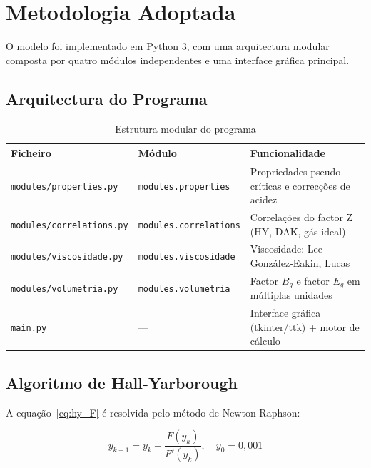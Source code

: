 \documentclass[12pt, a4paper]{article}
\begin{document}
\section{Metodologia Adoptada}

O modelo foi implementado em Python 3, com uma arquitectura modular composta por
quatro módulos independentes e uma interface gráfica principal.

\subsection{Arquitectura do Programa}

\begin{table}[H]
  \centering
  \caption{Estrutura modular do programa}
  \label{tab:modulos}
  \begin{tabular}{@{}lll@{}}
    \toprule
    \textbf{Ficheiro} & \textbf{Módulo} & \textbf{Funcionalidade} \\
    \midrule
    \texttt{modules/properties.py}   & \texttt{modules.properties}
      & Propriedades pseudo-críticas e correcções de acidez \\
    \texttt{modules/correlations.py} & \texttt{modules.correlations}
      & Correlações do factor Z (HY, DAK, gás ideal) \\
    \texttt{modules/viscosidade.py}  & \texttt{modules.viscosidade}
      & Viscosidade: Lee-González-Eakin, Lucas \\
    \texttt{modules/volumetria.py}   & \texttt{modules.volumetria}
      & Factor $B_g$ e factor $E_g$ em múltiplas unidades \\
    \texttt{main.py}                 & —
      & Interface gráfica (tkinter/ttk) + motor de cálculo \\
    \bottomrule
  \end{tabular}
\end{table}

\subsection{Algoritmo de Hall-Yarborough}

A equação~\eqref{eq:hy_F} é resolvida pelo método de Newton-Raphson:

\begin{equation}
  y_{k+1} = y_k - \frac{F(y_k)}{F'(y_k)}, \quad y_0 = 0{,}001
\end{equation}
\end{document}
